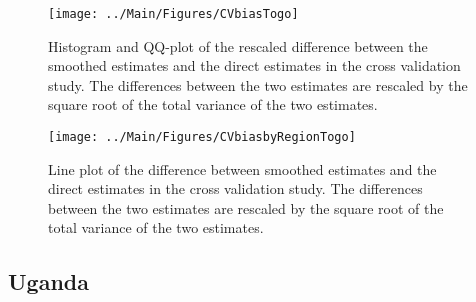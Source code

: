 \documentclass[12pt]{article}\usepackage[]{graphicx}\usepackage[]{color}
\newenvironment{knitrout}{}{} %
\begin{document}
\begin{knitrout}
\color{fgcolor}\begin{figure}[bht]

{\centering \texttt{[image: ../Main/Figures/CVbiasTogo]} 

}

\caption[Histogram and QQ-plot of the rescaled difference between the smoothed estimates and the direct estimates in the cross validation study]{Histogram and QQ-plot of the rescaled difference between the smoothed estimates and the direct estimates in the cross validation study. The differences between the two estimates are rescaled by the square root of the total variance of the two estimates.}\label{fig:unnamed-chunk-319}
\end{figure}


\end{knitrout}

\begin{knitrout}
\color{fgcolor}\begin{figure}[bht]

{\centering \texttt{[image: ../Main/Figures/CVbiasbyRegionTogo]} 

}

\caption[Line plot of the difference between smoothed estimates and the direct estimates in the cross validation study]{Line plot of the difference between smoothed estimates and the direct estimates in the cross validation study. The differences between the two estimates are rescaled by the square root of the total variance of the two estimates.}\label{fig:unnamed-chunk-320}
\end{figure}


\end{knitrout}


\clearpage
\subsection{Uganda}


\end{document}

